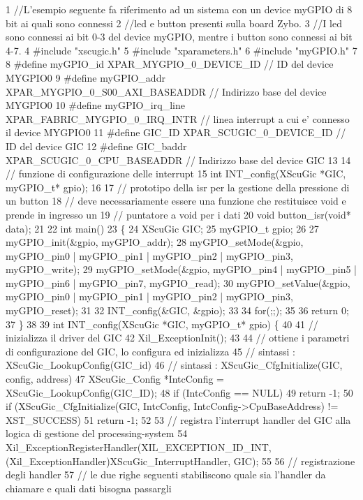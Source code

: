 \begin{DoxyCode}
1 //L'esempio seguente fa riferimento ad un sistema con un device myGPIO di 8 bit ai quali sono connessi
2 //led e button presenti sulla board Zybo.
3 //I led sono connessi ai bit 0-3 del device myGPIO, mentre i button sono connessi ai bit 4-7.
4 #include "xscugic.h"
5 #include "xparameters.h"
6 #include "myGPIO.h"
7 
8 #define myGPIO\_id           XPAR\_MYGPIO\_0\_DEVICE\_ID         // ID del device MYGPIO0
9 #define myGPIO\_addr         XPAR\_MYGPIO\_0\_S00\_AXI\_BASEADDR  // Indirizzo base del device MYGPIO0
10 #define myGPIO\_irq\_line     XPAR\_FABRIC\_MYGPIO\_0\_IRQ\_INTR   // linea interrupt a cui e' connesso il device
       MYGPIO0
11 #define GIC\_ID              XPAR\_SCUGIC\_0\_DEVICE\_ID         // ID del device GIC
12 #define GIC\_baddr           XPAR\_SCUGIC\_0\_CPU\_BASEADDR      // Indirizzo base del device GIC
13 
14 // funzione di configurazione delle interrupt
15 int INT\_config(XScuGic *GIC, myGPIO\_t* gpio);
16 
17 // prototipo della isr per la gestione della pressione di un button
18 // deve necessariamente essere una funzione che restituisce void e prende in ingresso un
19 // puntatore a void per i dati
20 void button\_isr(void* data);
21 
22 int main()
23 \{
24     XScuGic GIC;
25     myGPIO\_t gpio;
26 
27     myGPIO\_init(&gpio, myGPIO\_addr);
28     myGPIO\_setMode(&gpio, myGPIO\_pin0 | myGPIO\_pin1 | myGPIO\_pin2 | myGPIO\_pin3, myGPIO\_write);
29     myGPIO\_setMode(&gpio, myGPIO\_pin4 | myGPIO\_pin5 | myGPIO\_pin6 | myGPIO\_pin7, myGPIO\_read);
30     myGPIO\_setValue(&gpio, myGPIO\_pin0 | myGPIO\_pin1 | myGPIO\_pin2 | myGPIO\_pin3, myGPIO\_reset);
31 
32     INT\_config(&GIC, &gpio);
33 
34     for(;;);
35 
36     return 0;
37 \}
38 
39 int INT\_config(XScuGic *GIC, myGPIO\_t* gpio) \{
40 
41     // inizializza il driver del GIC
42     Xil\_ExceptionInit();
43 
44     // ottiene i parametri di configurazione del GIC, lo configura ed inizializza
45     // sintassi : XScuGic\_LookupConfig(GIC\_id)
46     // sintassi : XScuGic\_CfgInitialize(GIC, config, address)
47     XScuGic\_Config *IntcConfig = XScuGic\_LookupConfig(GIC\_ID);
48     if (IntcConfig == NULL)
49         return -1;
50     if (XScuGic\_CfgInitialize(GIC, IntcConfig, IntcConfig->CpuBaseAddress) != XST\_SUCCESS)
51         return -1;
52 
53     // registra l'interrupt handler del GIC alla logica di gestione del processing-system
54     Xil\_ExceptionRegisterHandler(XIL\_EXCEPTION\_ID\_INT,(Xil\_ExceptionHandler)XScuGic\_InterruptHandler, GIC);
55 
56     // registrazione degli handler
57     // le due righe seguenti stabiliscono quale sia l'handler da chiamare e quali dati bisogna passargli

\end{DoxyCode}
